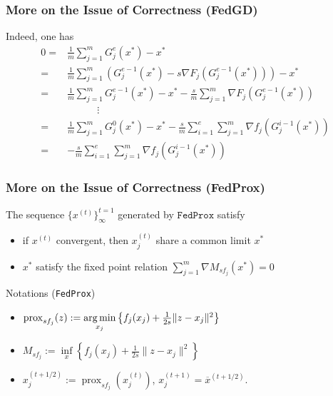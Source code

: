 
\begin{frame}
\frametitle{More on the Issue of Correctness (FedGD)}

Indeed, one has
{\smaller
\begin{align*}
0 = & \frac{1}{m}\sum_{j=1}^m G^e_j(x^{*}) - x^{*} \\
= & \frac{1}{m}\sum_{j=1}^m \left( G^{e-1}_j(x^{*}) - s\nabla F_j (G^{e-1}_j(x^{*})) \right) - x^{*} \\
= & \frac{1}{m}\sum_{j=1}^m G^{e-1}_j(x^{*}) - x^{*} - \frac{s}{m}\sum_{j=1}^m\nabla F_j (G^{e-1}_j(x^{*})) \\
& \hspace{3em} \vdots \\
= & \frac{1}{m}\sum_{j=1}^m G^{0}_j(x^{*}) - x^{*} - \frac{s}{m}\sum\limits_{i=1}^e\sum\limits_{j=1}^m \nabla f_j(G_j^{i-1}(x^*)) \\
= & - \frac{s}{m}\sum\limits_{i=1}^e\sum\limits_{j=1}^m \nabla f_j(G_j^{i-1}(x^*))
\end{align*}
}

\end{frame}


\begin{frame}
\frametitle{More on the Issue of Correctness (FedProx)}

\begin{prop}
The sequence $\{x^{(t)}\}^{t=1}_{\infty}$ generated by $\texttt{FedProx}$ satisfy
\begin{itemize}
    \item if $x^{(t)}$ convergent, then $x_j^{(t)}$ share a common limit $x^*$
    \vspace{-0.3em}
    \item $x^*$ satisfy the fixed point relation {$\sum\limits_{j=1}^m \nabla M_{sf_j}(x^*) = 0$}
\end{itemize}
\end{prop}

\begin{block}{Notations (\texttt{FedProx})}
\begin{itemize}
\item $\operatorname{prox}_{sf_j} (z) := \operatorname*{arg\,min}\limits_{x_j} \left\{ f_j(x_j) + \frac{1}{2s} \lVert z-x_j \rVert^2 \right\}$
\vspace{-0.3em}
\item $M_{sf_j} := \inf\limits_x \left\{ f_j(x_j) + \frac{1}{2s} \lVert z-x_j \rVert^2 \right\}$
\vspace{-0.3em}
\item $x_j^{(t+1/2)} := \operatorname{prox}_{sf_j}(x_j^{(t)})$, $x_j^{(t+1)} = \overline{x}^{(t+1/2)}.$
\end{itemize}
\end{block}

\end{frame}

